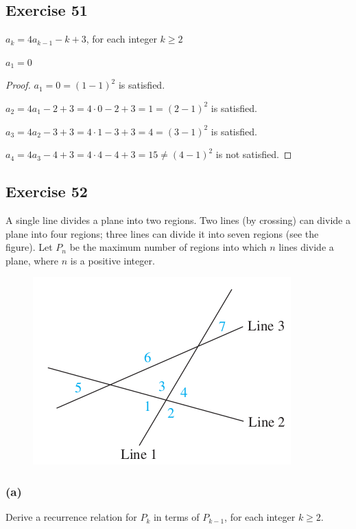 \documentclass[14pt]{extarticle}
\begin{document}
\subsection{Exercise 51}
\(a_k = 4a_{k-1} - k + 3\), for each integer \(k \geq 2\)

\(a_1 = 0\)

\begin{proof}
\(a_1 = 0 = (1-1)^2\) is satisfied.

\(a_2 = 4a_1 - 2 + 3 = 4 \cdot 0 - 2 + 3 = 1 = (2-1)^2\) is satisfied.

\(a_3 = 4a_2 - 3 + 3 = 4 \cdot 1 - 3 + 3 = 4 = (3-1)^2\) is satisfied.

\(a_4 = 4a_3 - 4 + 3 = 4 \cdot 4 - 4 + 3 = 15 \neq (4-1)^2\) is not satisfied.
\end{proof}

\subsection{Exercise 52}
A single line divides a plane into two regions. Two lines (by crossing) can divide a plane into four regions; three 
lines can divide it into seven regions (see the figure). Let $P_n$ be the maximum number of regions into which $n$ 
lines divide a plane, where $n$ is a positive integer.

\begin{figure}[ht!]
\centering
\includegraphics[scale=0.5]{../images/5.7.52.png}
\end{figure}

\subsubsection{(a)}
Derive a recurrence relation for $P_k$ in terms of \(P_{k-1}\), for each integer \(k \geq 2\).
\end{document}
